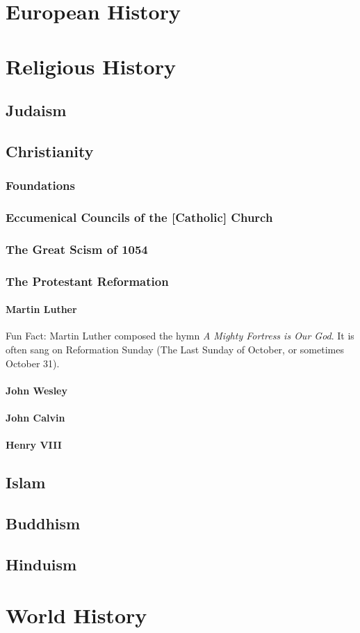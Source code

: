 	
		
		
	\section{European History}
	\section{Religious History}
		\subsection{Judaism}
		\subsection{Christianity}
			\subsubsection{Foundations}
			\subsubsection{Eccumenical Councils of the [Catholic] Church}
			
				
			\subsubsection{The Great Scism of 1054}
			\subsubsection{The Protestant Reformation}
				\paragraph{Martin Luther} \label{MartinLuther}
					Fun Fact: Martin Luther composed the hymn \textit{A Mighty Fortress is Our God}.  It is often sang on Reformation Sunday (The Last Sunday of October, or sometimes October 31).
				\paragraph{John Wesley}
				\paragraph{John Calvin}
				\paragraph{Henry VIII}
				
				
		\subsection{Islam}
		\subsection{Buddhism}
		\subsection{Hinduism}
		\subsection{}
	\section{World History}
	